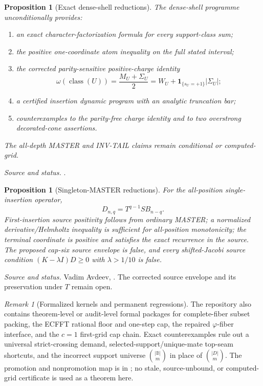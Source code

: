 \documentclass[11pt,a4paper]{amsart}
\numberwithin{equation}{section}
\newtheorem{proposition}[theorem]{Proposition}
\theoremstyle{remark}
\newtheorem{remark}[theorem]{Remark}
\newcommand{\B}{\mathbb B}
\newcommand{\abs}[1]{\lvert#1\rvert}
\newcommand{\source}[1]{\par\smallskip\noindent\textit{Source and status.} #1\par}
\begin{document}
\begin{proposition}[Exact dense-shell reductions]\label{prop:dense-shell}
The dense-shell programme unconditionally provides:
\begin{enumerate}[label=\textup{(\roman*)},leftmargin=*]
\item an exact character-factorization formula for every support-class sum;
\item the positive one-coordinate atom inequality on the full stated interval;
\item the corrected parity-sensitive positive-charge identity
\[
 \omega(\operatorname{class}(U))
 =\frac{M_U+\Sigma_U}{2}
 =W_U+\mathbf1_{\{s_U=+1\}}\abs{\Sigma_U};
\]
\item a certified insertion dynamic program with an analytic truncation bar;
\item counterexamples to the parity-free charge identity and to two overstrong decorated-cone assertions.
\end{enumerate}
The all-depth MASTER and INV-TAIL claims remain conditional or computed-grid.
\end{proposition}
\source{\cite{DenseShellCharges26}.}

\begin{proposition}[Singleton-MASTER reductions]\label{prop:singleton-master}
For the all-position single-insertion operator,
\[
 D_{n,q}=T^{q-1}SB_{n-q}.
\]
First-insertion source positivity follows from ordinary MASTER; a normalized derivative/Helmholtz inequality is sufficient for all-position monotonicity; the terminal coordinate is positive and satisfies the exact recurrence in the source.  The proposed cap-six source envelope is false, and every shifted-Jacobi source condition $(K-\lambda I)D\ge0$ with $\lambda>1/10$ is false.
\end{proposition}
\source{Vadim Avdeev, \cite{AvdeevSIM26}.  The corrected source envelope and its preservation under $T$ remain open.}

\begin{remark}[Formalized kernels and permanent regressions]
The repository also contains theorem-level or audit-level formal packages for complete-fiber subset packing, the ECFFT rational floor and one-step cap, the repaired $\varphi$-fiber interface, and the $c=1$ first-grid cap chain.  Exact counterexamples rule out a universal strict-crossing demand, selected-support/unique-mate top-seam shortcuts, and the incorrect support universe $\binom{\abs\B}{m}$ in place of $\binom{\abs D}{m}$.  The promotion and nonpromotion map is in \cite{PRReport26}; no stale, source-unbound, or computed-grid certificate is used as a theorem here.
\end{remark}
\end{document}
